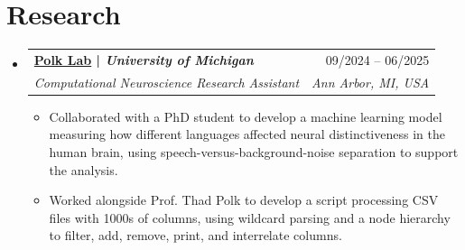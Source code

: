 \documentclass[letterpaper,11pt]{article}
\makeatletter
\newcommand{\resumeItem}[1]{
  \item\small{
    {#1 \vspace{-2pt}}
  }
}
\newcommand{\resumeSubheading}[4]{
  \vspace{-2pt}\item
    \begin{tabular*}{0.97\textwidth}[t]{l@{\extracolsep{\fill}}r}
      \textbf{#1} & #2 \\
      \textit{\small#3} & \textit{\small #4} \\
    \end{tabular*}\vspace{-7pt}
}
\newcommand{\resumeSubHeadingListStart}{\begin{itemize}[leftmargin=0.15in, label={}]}
\newcommand{\resumeSubHeadingListEnd}{\end{itemize}}
\newcommand{\resumeItemListStart}{\begin{itemize}}
\newcommand{\resumeItemListEnd}{\end{itemize}\vspace{-5pt}}
\makeatother
\begin{document}
\vspace{-1.2em}

\section{Research}
    \resumeSubHeadingListStart
        \resumeSubheading
            {\href{https://sites.lsa.umich.edu/polklab/}{Polk Lab} | \textit{University of Michigan}}{09/2024 -- 06/2025}
            {Computational Neuroscience Research Assistant}{Ann Arbor, MI, USA}
            \resumeItemListStart
                \resumeItem{Collaborated with a PhD student to develop a machine learning model measuring how different languages affected neural distinctiveness in the human brain, using speech-versus-background-noise separation to support the analysis.}
                \vspace{-11pt}
                \resumeItem{Worked alongside Prof. Thad Polk to develop a script processing CSV files with 1000s of columns, using wildcard parsing and a node hierarchy to filter, add, remove, print, and interrelate columns.}
            \resumeItemListEnd
    \resumeSubHeadingListEnd

\vspace{-1.1em}

\end{document}
